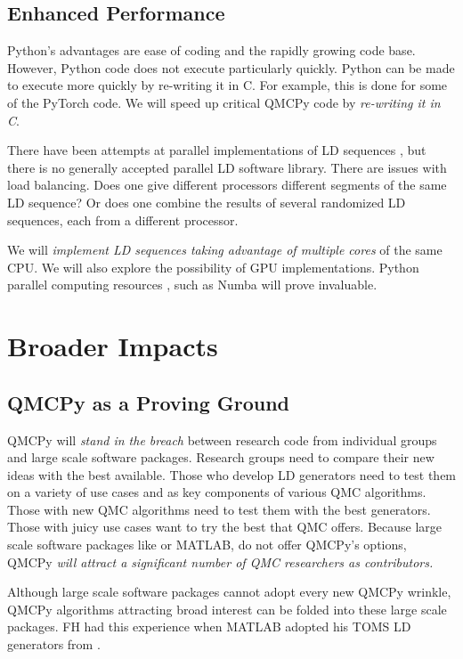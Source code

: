 \documentclass[11pt]{NSFamsart}
\begin{document}
\subsection{Enhanced Performance}
Python's advantages are ease of coding and the rapidly growing code base.  However, Python code does not execute particularly quickly.  Python can be made to execute more quickly by re-writing it in C.  For example, this is done for some of the PyTorch code.  We will speed up critical QMCPy code by \emph{re-writing it in C}.

There have been attempts at parallel implementations of LD sequences \cite{LiMul00a,OktSri02, SchUhl01,WanEtal06a,LiuHic04a}, but there is no generally accepted parallel LD software library.  There are issues with load balancing.  Does one give different processors different segments of the same LD sequence?  Or does one combine the results of several randomized LD sequences, each from a different processor.

We will \emph{implement LD sequences taking advantage of multiple cores} of the same CPU.  We will also explore the possibility of GPU implementations.  Python parallel computing resources \cite{ParallelPython}, such as Numba \cite{Numba} will prove invaluable.



\section{Broader Impacts}
\subsection{QMCPy as a Proving Ground}
QMCPy will \emph{stand in the breach} between research code from individual groups and large scale software packages.  Research groups need to compare their new ideas with the best available.  Those who develop LD generators need to test them on a variety of use cases and as key components of various QMC algorithms.  Those with new QMC algorithms need to test them with the best generators.  Those with juicy use cases want to try the best that QMC offers.  Because large scale software packages like  or MATLAB, do not offer QMCPy's options,  QMCPy \emph{will attract a significant number of QMC researchers as contributors.}

Although large scale software packages cannot adopt every new QMCPy wrinkle, QMCPy algorithms attracting broad interest can be folded into these large scale packages. FH had this experience when MATLAB adopted his TOMS LD generators from \cite{HonHic00a}.
\end{document}
